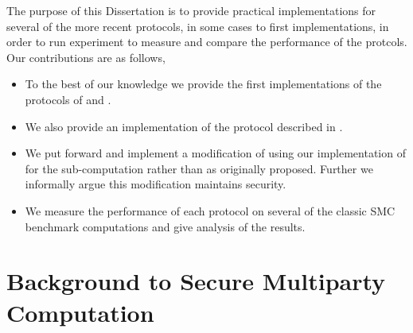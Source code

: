 \documentclass[ %
                    author={Nicholas Tutte},
                supervisor={Prof. Nigel Smart},
                    degree={MEng},
                     title={Secure Two Party Computation},
                  subtitle={A practical comparison of recent protocols},
                      type={Research - GG1K},
                      year={2015} ]{dissertation}
\begin{document}
		The purpose of this Dissertation is to provide practical implementations for several of the more recent protocols, in some cases to first implementations, in order to run experiment to measure and compare the performance of the protcols.\\

		Our contributions are as follows,

		\begin{itemize}
			\item To the best of our knowledge we provide the first implementations of the protocols of \cite{LindellAndPinkas2011} and \cite{Lindell_CnC_2013}.
			\item We also provide an implementation of the protocol described in \cite{Katz_Symm_CnC_2013}.
			\item We put forward and implement a modification of \cite{Lindell_CnC_2013} using our implementation of \cite{Katz_Symm_CnC_2013} for the sub-computation rather than \cite{LindellAndPinkas2011} as originally proposed. Further we informally argue this modification maintains security.
			\item We measure the performance of each protocol on several of the classic SMC benchmark computations and give analysis of the results.

		\end{itemize}




	\chapter{Background to Secure Multiparty Computation} \label{sec:BG_toSMC}
\end{document}
